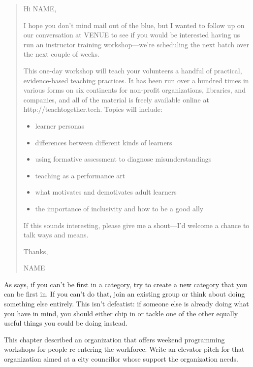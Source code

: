 \begin{quote}

  \noindent
  Hi NAME,

  I hope you don't mind mail out of the blue,
  but I wanted to follow up on our conversation at VENUE
  to see if you would be interested having us run an instructor training workshop---we're
  scheduling the next batch over the next couple of weeks.

  This one-day workshop will teach your volunteers
  a handful of practical, evidence-based teaching practices.
  It has been run over a hundred times in various forms on six continents
  for non-profit organizations, libraries, and companies,
  and all of the material is freely available online at http://teachtogether.tech.
  Topics will include:

  \begin{itemize}
  \item learner personas
  \item differences between different kinds of learners
  \item using formative assessment to diagnose misunderstandings
  \item teaching as a performance art
  \item what motivates and demotivates adult learners
  \item the importance of inclusivity and how to be a good ally
  \end{itemize}
  
  If this sounds interesting,
  please give me a shout---I'd welcome a chance to talk ways and means.

  Thanks,

  NAME

\end{quote}


As \cite{Kuch2011} says,
if you can't be first in a category,
try to create a new category that you can be first in.
If you can't do that,
join an existing group or think about doing something else entirely.
This isn't defeatist:
if someone else is already doing what you have in mind,
you should either chip in or tackle one of the other equally useful things
you could be doing instead.



This chapter described an organization
that offers weekend programming workshops for people re-entering the workforce.
Write an elevator pitch for that organization
aimed at a city councillor whose support the organization needs.

